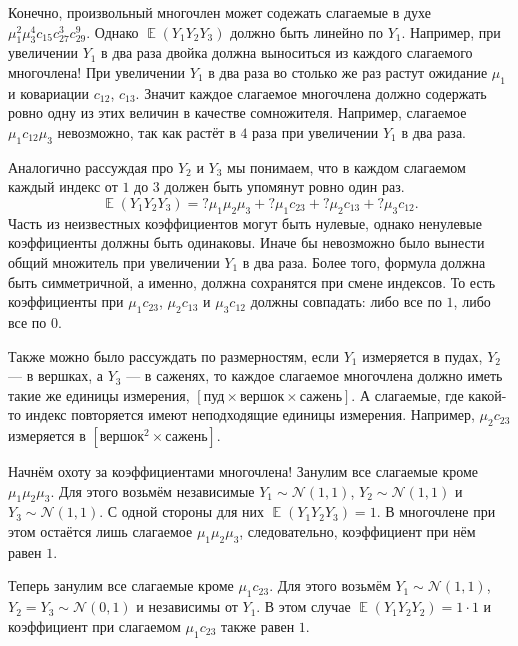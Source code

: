 \documentclass[12pt]{article}
\DeclareMathOperator{\E}{\mathbb{E}}
\newcommand{\cN}{\mathcal{N}}
\begin{document}
Конечно, произвольный многочлен может содежать слагаемые в духе $\mu_1^2 \mu_3^4 c_{15} c_{27}^3 c_{29}^9$.
Однако $\E(Y_1 Y_2 Y_3)$ должно быть линейно по $Y_1$. 
Например, при увеличении $Y_1$ в два раза двойка должна выноситься из каждого слагаемого многочлена!
При увеличении $Y_1$ в два раза во столько же раз растут ожидание $\mu_1$ и ковариации $c_{12}$, $c_{13}$.
Значит каждое слагаемое многочлена должно содержать ровно одну из этих величин в качестве сомножителя.
Например, слагаемое $\mu_1 c_{12} \mu_3$ невозможно, так как растёт в $4$ раза при увеличении $Y_1$ в два раза.

Аналогично рассуждая про $Y_2$ и $Y_3$ мы понимаем, что в каждом слагаемом каждый индекс от $1$ до $3$ должен быть упомянут ровно один раз.
\[
\E(Y_1 Y_2 Y_3) = ? \mu_1 \mu_2 \mu_3 + ? \mu_1 c_{23} + ? \mu_2 c_{13} + ? \mu_3 c_{12}.
\]
Часть из неизвестных коэффициентов могут быть нулевые, однако ненулевые коэффициенты должны быть одинаковы. 
Иначе бы невозможно было вынести общий множитель при увеличении $Y_1$ в два раза. 
Более того, формула должна быть симметричной, а именно, должна сохранятся при смене индексов. 
То есть коэффициенты при $\mu_1 c_{23}$, $\mu_2 c_{13}$ и $\mu_3 c_{12}$ должны совпадать: либо все по $1$, либо все по $0$.

Также можно было рассуждать по размерностям, если $Y_1$ измеряется в пудах, $Y_2$ — в вершках, а $Y_3$ — в саженях, 
то каждое слагаемое многочлена должно иметь такие же единицы измерения, $[\text{пуд}\times \text{вершок} \times\text{сажень}]$. 
А слагаемые, где какой-то индекс повторяется имеют неподходящие единицы измерения. 
Например, $\mu_2 c_{23}$ измеряется в $[\text{вершок}^2 \times\text{сажень}]$. 

Начнём охоту за коэффициентами многочлена! Занулим все слагаемые кроме $\mu_1 \mu_2 \mu_3$.
Для этого возьмём независимые $Y_1 \sim \cN(1, 1)$, $Y_2\sim \cN(1, 1)$ и $Y_3\sim \cN(1, 1)$.
С одной стороны для них $\E(Y_1 Y_2 Y_3) = 1$. 
В многочлене при этом остаётся лишь слагаемое $\mu_1 \mu_2 \mu_3$,
следовательно, коэффициент при нём равен $1$.

Теперь занулим все слагаемые кроме $\mu_1 c_{23}$.
Для этого возьмём $Y_1 \sim \cN(1, 1)$, $Y_2 = Y_3 \sim \cN(0, 1)$ и независимы от $Y_1$.
В этом случае $\E(Y_1 Y_2 Y_2) = 1 \cdot 1$ и коэффициент при слагаемом $\mu_1 c_{23}$ также равен $1$.
\end{document}
